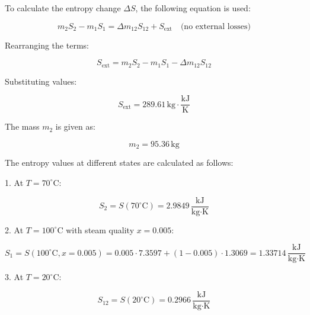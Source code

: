 To calculate the entropy change \( \Delta S \), the following equation is used:  

\[
m_{2} S_{2} - m_{1} S_{1} = \Delta m_{12} S_{12} + S_{\text{ext}} \quad \text{(no external losses)}
\]

Rearranging the terms:  

\[
S_{\text{ext}} = m_{2} S_{2} - m_{1} S_{1} - \Delta m_{12} S_{12}
\]

Substituting values:  

\[
S_{\text{ext}} = 289.61 \, \text{kg} \cdot \frac{\text{kJ}}{\text{K}}
\]

The mass \( m_2 \) is given as:  

\[
m_2 = 95.36 \, \text{kg}
\]

The entropy values at different states are calculated as follows:  

1. At \( T = 70^\circ\text{C} \):  

\[
S_2 = S(70^\circ\text{C}) = 2.9849 \, \frac{\text{kJ}}{\text{kg·K}}
\]

2. At \( T = 100^\circ\text{C} \) with steam quality \( x = 0.005 \):  

\[
S_1 = S(100^\circ\text{C}, x = 0.005) = 0.005 \cdot 7.3597 + (1 - 0.005) \cdot 1.3069 = 1.33714 \, \frac{\text{kJ}}{\text{kg·K}}
\]

3. At \( T = 20^\circ\text{C} \):  

\[
S_{12} = S(20^\circ\text{C}) = 0.2966 \, \frac{\text{kJ}}{\text{kg·K}}
\]